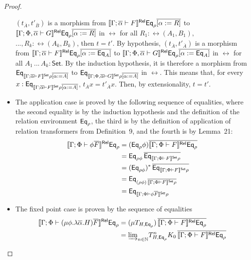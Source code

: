 \documentclass[acmsmall,review,anonymous]{acmart}
\theoremstyle{definition}
\newcommand{\set}{\mathsf{Set}}
\begin{document}
\begin{proof}
\begin{itemize}
  $(t_{\overline{A}}, t'_{\overline{B}})$ is a morphism from
  $\llbracket{\Gamma; \overline\alpha \vdash F}\rrbracket^{\mathsf{Rel}}
  \mathsf{Eq}_{\rho}\overline{[\alpha := R]}$ to $\llbracket{\Gamma ; \Phi,
    \overline\alpha \vdash G}\rrbracket^{\mathsf{Rel}} \mathsf{Eq}_{\rho}\overline{[\alpha := R]}$ in
  $\rel$ for all ${R_1 : \rel(A_1,B_1),}$ $...,{R_k : \rel(A_k,B_k)}$,
  then $t = t'$.  By hypothesis, $(t_{\overline{A}},
  t'_{\overline{A}})$ is a morphism from $\llbracket{\Gamma;
    \overline\alpha \vdash F}\rrbracket^{\mathsf{Rel}} \mathsf{Eq}_{\rho}\overline{[\alpha :=
      \mathsf{Eq}_{A}]}$ to $\llbracket{\Gamma ; \Phi, \overline\alpha \vdash G}\rrbracket^{\mathsf{Rel}}
  \mathsf{Eq}_{\rho}\overline{[\alpha := \mathsf{Eq}_{A}]}$ in $\rel$ for all
  $A_1\,...\,A_k : \set$. By the induction hypothesis, it is therefore
  a morphism from $\Eq_{\setsem{\Gamma; \overline\alpha \vdash F}
    \rho\overline{[\alpha := A]}}$ to $\Eq_{\setsem{\Gamma ; \Phi,
      \overline\alpha \vdash G} \rho\overline{[\alpha := A]}}$ in
  $\rel$. This means that, for every $x : \Eq_{\setsem{\Gamma;
      \overline\alpha \vdash F} \rho\overline{[\alpha := A]}}$,
  $t_{\overline{A}}x = t'_{\overline{A}}x$.  Then, by extensionality,
  $t = t'$.
\item The application case is proved by the following sequence of
  equalities, where the second equality is by the induction hypothesis
  and the definition of the relation environment $\mathsf{Eq}_\rho$, the third
  is by the definition of application of relation transformers from
  Definition~9, and the fourth is by
  Lemma~21:
\[
\begin{split}
\relsem{\Gamma; \Phi \vdash \phi\ol{F}}\Eq_{\rho} &=
(\Eq_{\rho}\phi)\ol{\relsem{\Gamma; \Phi \vdash F}
\Eq_{\rho}}\\
&= \Eq_{\rho \phi}\, \ol{\Eq_{\setsem{\Gamma; \Phi \vdash F}
  \rho}}\\
&= (\Eq_{\rho \phi})^* \,\ol{\Eq_{\setsem{\Gamma; \Phi \vdash F}
  \rho}}\\
&= \Eq_{(\rho \phi) \,\ol{\setsem{\Gamma; \Phi \vdash F} \rho}}\\
&= \Eq_{\setsem{\Gamma; \Phi \vdash \phi\ol{F}}\rho}
\end{split}
\]
\item The fixed point case is proven by the sequence of equalities
\[
\begin{split}
\relsem{\Gamma; \Phi \vdash (\mu \phi.\lambda
  \ol{\alpha}. H)\ol{F}}\Eq_{\rho} 
&=(\mu {T_{H, \Eq_{\rho}}}) \,\ol{\relsem{\Gamma; \Phi \vdash F}\Eq_{\rho}}\\ 
&= \colim{n \in \nat}{T^n_{H, \Eq_{\rho}} K_0}\, \ol{\relsem{\Gamma; \Phi
  \vdash F}\Eq_{\rho}}\\

\end{split}\]
\end{itemize}
\end{proof}
\end{document}
